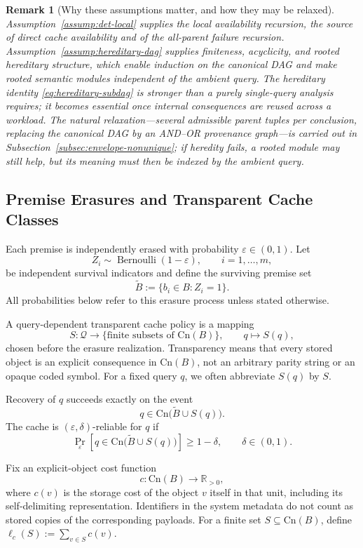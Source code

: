 \documentclass[journal]{IEEEtran}
\newcommand{\Cn}{\text{Cn}}
\newtheorem{remark}{Remark}[section]
\numberwithin{equation}{section}
\begin{document}
\begin{remark}[Why these assumptions matter, and how they may be relaxed]
\label{rem:assumption-roles}
Assumption~\ref{assump:det-local} supplies the local availability
recursion, the source of direct cache availability and of the all-parent
failure recursion.  Assumption~\ref{assump:hereditary-dag} supplies
finiteness, acyclicity, and rooted hereditary structure, which enable
induction on the canonical DAG and make rooted semantic modules independent
of the ambient query.  The hereditary identity \eqref{eq:hereditary-subdag}
is stronger than a purely single-query analysis requires; it becomes
essential once internal consequences are reused across a workload.  The
natural relaxation---several admissible parent tuples per conclusion,
replacing the canonical DAG by an AND--OR provenance graph---is carried out
in Subsection~\ref{subsec:envelope-nonunique}; if heredity fails, a rooted
module may still help, but its meaning must then be indexed by the ambient
query.
\end{remark}

\subsection{Premise Erasures and Transparent Cache Classes}
\label{subsec:erasure-cache-model}

Each premise is independently erased with probability
\(\varepsilon\in(0,1)\).  Let
\[
  Z_i\sim\operatorname{Bernoulli}(1-\varepsilon),
  \qquad i=1,\ldots,m,
\]
be independent survival indicators and define the surviving premise set
\[
  \widetilde B
  :=
  \{b_i\in B:Z_i=1\}.
\]
All probabilities below refer to this erasure process unless stated
otherwise.

A query-dependent transparent cache policy is a mapping
\[
  S:\mathcal Q\longrightarrow
  \bigl\{\text{finite subsets of }\Cn(B)\bigr\},
  \qquad q\longmapsto S(q),
\]
chosen before the erasure realization.  Transparency means that every stored
object is an explicit consequence in \(\Cn(B)\), not an arbitrary parity
string or an opaque coded symbol.  For a fixed query \(q\), we often
abbreviate \(S(q)\) by \(S\).

Recovery of \(q\) succeeds exactly on the event
\[
  q\in\Cn\bigl(\widetilde B\cup S(q)\bigr).
\]
The cache is \((\varepsilon,\delta)\)-reliable for \(q\) if
\[
  \Pr_{\varepsilon}\!\left[
    q\in\Cn\bigl(\widetilde B\cup S(q)\bigr)
  \right]
  \ge 1-\delta,
  \qquad \delta\in(0,1).
\]

Fix an explicit-object cost function
\[
  c:\Cn(B)\longrightarrow\mathbb R_{>0},
\]
where \(c(v)\) is the storage cost of the object \(v\) itself in that unit,
including its self-delimiting representation.  Identifiers in
the system metadata do not count as stored copies of the corresponding
payloads.  For a finite set \(S\subseteq\Cn(B)\), define
\(\ell_c(S):=\sum_{v\in S}c(v)\).
\end{document}
